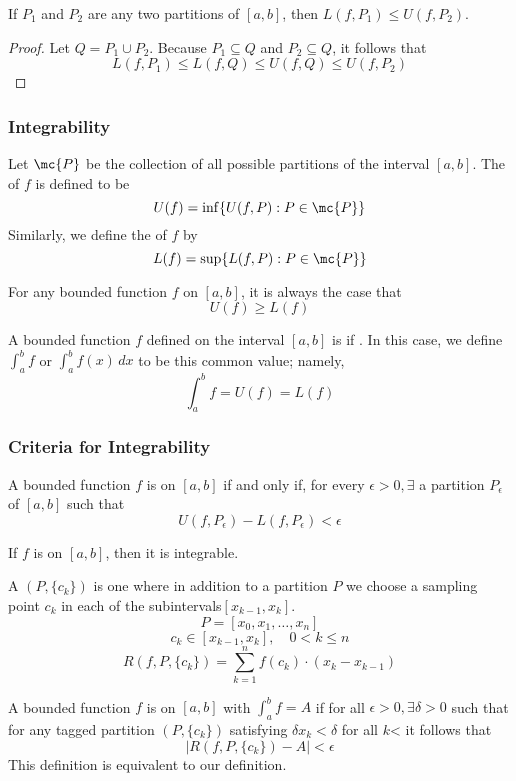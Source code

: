 \documentclass[11pt]{article}
\begin{document}
\lemma If $P_1$ and $P_2$ are any two partitions of $[a,b]$, then $L(f, P_1) \leq U(f, P_2)$.

\begin{proof}
	Let $Q = P_1 \cup P_2$. Because $P_1 \subseteq Q$ and $P_2 \subseteq Q$, it follows that 
	$$L(f, P_1) \leq L(f, Q) \leq U(f,Q) \leq U(f, P_2)$$
	
\end{proof}

\subsubsection{Integrability}

Let $\mc{P}$ be the collection of all possible partitions of the interval $[a,b]$. The  of $f$ is defined to be
$$U(f) = \inf\{ U(f,P): P \in \mc{P}\}$$
Similarly, we define the  of $f$ by
$$L(f) = \sup\{ L(f,P): P \in \mc{P}\}$$

\lemma For any bounded function $f$ on $[a,b]$, it is always the case that $$U(f) \geq L(f)$$

 A bounded function $f$ defined on the interval $[a,b]$ is  if . In this case, we define $\int_a^b f$ or $\int_a^b f(x) \, dx$ to be this common value; namely,
$$\int_a^b f = U(f) = L(f)$$

\subsubsection{Criteria for Integrability}
A bounded function $f$ is  on $[a,b]$ if and only if, for every $\epsilon > 0, \exists$ a partition $P_{\epsilon}$ of $[a,b]$ such that
$$U(f, P_\epsilon) - L(f, P_\epsilon) < \epsilon$$

\theorem If $f$ is  on $[a,b]$, then it is integrable.

 A  $(P, \{c_k\})$ is one where in addition to a partition $P$ we choose a sampling point $c_k$ in each of the subintervals$[x_{k-1}, x_k]$.
$$P = [x_0, x_1, \hdots, x_n]$$
$$c_k \in [x_{k-1}, x_{k}], \quad 0 < k \leq n$$
$$R(f, P, \{c_k\}) = \sum_{k=1}^n f(c_k) \cdot (x_k - x_{k-1})$$

 A bounded function $f$ is  on $[a,b]$ with $\int_a^b f = A$ if for all $\epsilon > 0, \exists \delta > 0$ such that for any tagged partition $(P, \{c_k\})$ satisfying $\delta x_k < \delta$ for all $k$< it follows that
$$|R(f, P, \{c_k\}) - A| < \epsilon$$
\remark
This definition is equivalent to our definition.
\end{document}
